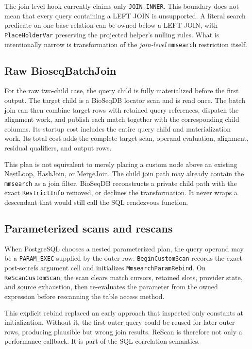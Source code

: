 The join-level hook currently claims only \texttt{JOIN\_INNER}.  This boundary
does not mean that every query containing a LEFT JOIN is unsupported.  A
literal search predicate on one base relation can be owned below a LEFT JOIN,
with \texttt{PlaceHolderVar} preserving the projected helper's nulling rules.
What is intentionally narrow is transformation of the \emph{join-level}
\texttt{mmsearch} restriction itself.

\subsection{Raw BioseqBatchJoin}

For the raw two-child case, the query child is fully materialized before the
first output.  The target child is a BioSeqDB locator scan and is read once.
The batch join can then combine target rows with retained query references,
dispatch the alignment work, and publish each match together with the
corresponding child columns.  Its startup cost includes the entire query
child and materialization work.  Its total cost adds the complete target scan,
operand evaluation, alignment, residual qualifiers, and output rows.

This plan is not equivalent to merely placing a custom node above an existing
NestLoop, HashJoin, or MergeJoin.  The child join path may already contain the
\texttt{mmsearch} as a join filter.  BioSeqDB reconstructs a private child
path with the exact \texttt{RestrictInfo} removed, or declines the
transformation.  It never wraps a descendant that would still call the SQL
rendezvous function.

\subsection{Parameterized scans and rescans}

When PostgreSQL chooses a nested parameterized plan, the query operand may be
a \texttt{PARAM\_EXEC} supplied by the outer row.  \texttt{BeginCustomScan}
records the exact post-setrefs argument cell and initializes
\texttt{MmsearchParamRebind}.  On \texttt{ReScanCustomScan}, the scan clears
match cursors, retained slots, provider state, and source exhaustion, then
re-evaluates the parameter from the owned expression before rescanning the
table access method.

This explicit rebind replaced an early approach that inspected only constants
at initialization.  Without it, the first outer query could be reused for
later outer rows, producing plausible but wrong join results.  ReScan is
therefore not only a performance callback.  It is part of the SQL correlation
semantics.

